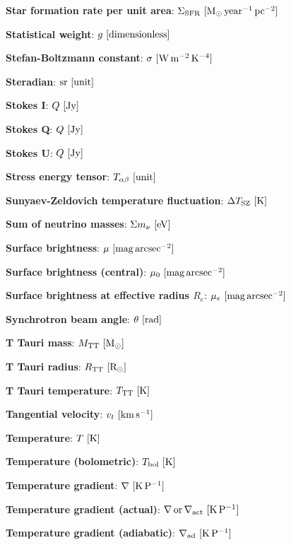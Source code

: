 \documentclass[a4paper,10pt]{article}
\begin{document}
{\noindent}\textbf{Star formation rate per unit area}: $\Sigma_\mathrm{SFR} ~ [{\rm M_\odot\,year^{-1}\,pc^{-2}}]$

{\noindent}\textbf{Statistical weight}: $g ~ [{\rm dimensionless}]$

{\noindent}\textbf{Stefan-Boltzmann constant}: $\sigma ~ [{\rm W\,m^{-2}\,K^{-4}}]$

{\noindent}\textbf{Steradian}: ${\rm sr} ~ [{\rm unit}]$

{\noindent}\textbf{Stokes I}: $Q ~ [{\rm Jy}]$

{\noindent}\textbf{Stokes Q}: $Q ~ [{\rm Jy}]$

{\noindent}\textbf{Stokes U}: $Q ~ [{\rm Jy}]$

{\noindent}\textbf{Stress energy tensor}: $T_{\alpha\beta} ~ [{\rm unit}]$

{\noindent}\textbf{Sunyaev-Zeldovich temperature fluctuation}: $\Delta T_\mathrm{SZ} ~ [{\rm K}]$

{\noindent}\textbf{Sum of neutrino masses}: $\Sigma m_\nu ~ [{\rm eV}]$

{\noindent}\textbf{Surface brightness}: $\mu ~ [{\rm mag\,arcsec^{-2}}]$

{\noindent}\textbf{Surface brightness (central)}: $\mu_0 ~ [{\rm mag\,arcsec^{-2}}]$

{\noindent}\textbf{Surface brightness at effective radius $R_e$}: $\mu_e ~ [{\rm mag\,arcsec^{-2}}]$

{\noindent}\textbf{Synchrotron beam angle}: $\theta ~ [{\rm rad}]$

{\noindent}\textbf{T Tauri mass}: $M_{\rm TT} ~ [{\rm M_\odot}]$

{\noindent}\textbf{T Tauri radius}: $R_{\rm TT} ~ [{\rm R_\odot}]$

{\noindent}\textbf{T Tauri temperature}: $T_{\rm TT} ~ [{\rm K}]$

{\noindent}\textbf{Tangential velocity}: $v_t ~ [{\rm km\,s^{-1}}]$

{\noindent}\textbf{Temperature}: $T ~ [{\rm K}]$

{\noindent}\textbf{Temperature (bolometric)}: $T_{\rm bol} ~ [{\rm K}]$

{\noindent}\textbf{Temperature gradient}: $\nabla ~ [{\rm K\,P^{-1}}]$

{\noindent}\textbf{Temperature gradient (actual)}: $\nabla\,{\rm or}\,\nabla_{\rm act} ~ [{\rm K\,P^{-1}}]$

{\noindent}\textbf{Temperature gradient (adiabatic)}: $\nabla_{\rm ad} ~ [{\rm K\,P^{-1}}]$
\end{document}
